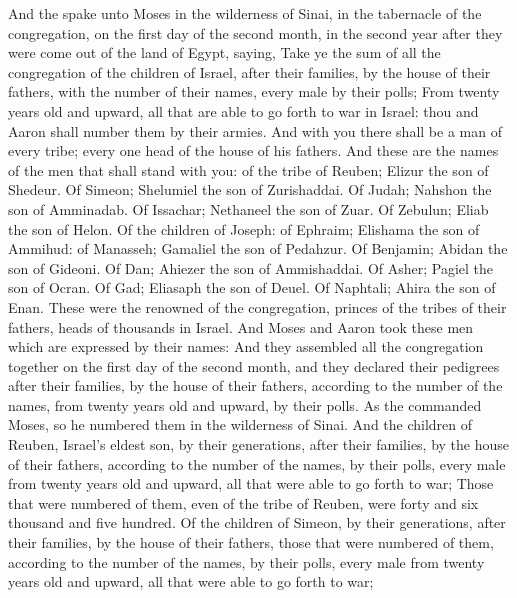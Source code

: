 
\begin{biblechapter} %
 And the \LORD spake unto Moses in the wilderness of Sinai, in the tabernacle of the congregation, on the first day of the second month, in the second year after they were come out of the land of Egypt, saying,
\verse Take ye the sum of all the congregation of the children of Israel, after their families, by the house of their fathers, with the number of their names, every male by their polls;
\verse From twenty years old and upward, all that are able to go forth to war in Israel: thou and Aaron shall number them by their armies.
\verse And with you there shall be a man of every tribe; every one head of the house of his fathers.
\verse And these are the names of the men that shall stand with you: of the tribe of Reuben; Elizur the son of Shedeur.
\verse Of Simeon; Shelumiel the son of Zurishaddai.
\verse Of Judah; Nahshon the son of Amminadab.
\verse Of Issachar; Nethaneel the son of Zuar.
\verse Of Zebulun; Eliab the son of Helon.
\verse Of the children of Joseph: of Ephraim; Elishama the son of Ammihud: of Manasseh; Gamaliel the son of Pedahzur.
\verse Of Benjamin; Abidan the son of Gideoni.
\verse Of Dan; Ahiezer the son of Ammishaddai.
\verse Of Asher; Pagiel the son of Ocran.
\verse Of Gad; Eliasaph the son of Deuel.
\verse Of Naphtali; Ahira the son of Enan.
\verse These were the renowned of the congregation, princes of the tribes of their fathers, heads of thousands in Israel.
\verse And Moses and Aaron took these men which are expressed by their names:
\verse And they assembled all the congregation together on the first day of the second month, and they declared their pedigrees after their families, by the house of their fathers, according to the number of the names, from twenty years old and upward, by their polls.
\verse As the \LORD commanded Moses, so he numbered them in the wilderness of Sinai.
\verse And the children of Reuben, Israel's eldest son, by their generations, after their families, by the house of their fathers, according to the number of the names, by their polls, every male from twenty years old and upward, all that were able to go forth to war;
\verse Those that were numbered of them, even of the tribe of Reuben, were forty and six thousand and five hundred.
\verse Of the children of Simeon, by their generations, after their families, by the house of their fathers, those that were numbered of them, according to the number of the names, by their polls, every male from twenty years old and upward, all that were able to go forth to war;

\end{biblechapter}
